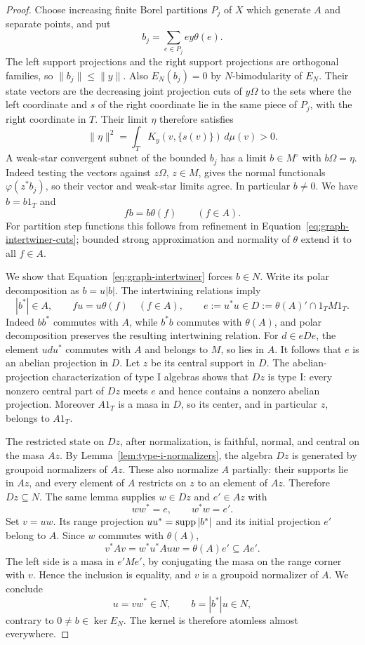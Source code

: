 \begin{proof}
Choose increasing finite Borel partitions $P_j$ of $X$ which generate
$A$ and separate points, and put
\begin{equation}\label{eq:graph-intertwiner-cuts}
 b_j=\sum_{e\in P_j} e y\theta(e).
\end{equation}
The left support projections and the right support projections are
orthogonal families, so $\|b_j\|\leq\|y\|$.
Also $E_N(b_j)=0$ by $N$-bimodularity of $E_N$.
Their state vectors are the decreasing joint projection cuts of
$y\Omega$ to the sets where the left coordinate and $s$ of the right
coordinate lie in the same piece of $P_j$, with the right coordinate
in $T$.  Their limit $\eta$ therefore satisfies
\[
 \|\eta\|^2
 =\int_T K_y(v,\{s(v)\})\,d\mu(v)>0.
\]
A weak-star convergent subnet of the bounded $b_j$ has a limit
$b\in M^\circ$ with $b\Omega=\eta$.  Indeed testing the vectors
against $z\Omega$, $z\in M$, gives the normal functionals
$\varphi(z^*b_j)$, so their vector and weak-star limits agree.
In particular $b\ne0$.  We have $b=b1_T$ and
\begin{equation}\label{eq:graph-intertwiner}
 fb=b\theta(f)\qquad(f\in A).
\end{equation}
For partition step functions this follows from refinement in
Equation~\eqref{eq:graph-intertwiner-cuts}; bounded strong approximation
and normality of $\theta$ extend it to all $f\in A$.

We show that Equation~\eqref{eq:graph-intertwiner} forces $b\in N$.
Write its polar decomposition as $b=u|b|$.
The intertwining relations imply
\[
 |b^*|\in A,\qquad fu=u\theta(f)\quad(f\in A),
 \qquad e:=u^*u\in D:=\theta(A)'\cap1_T M1_T.
\]
Indeed $bb^*$ commutes with $A$, while $b^*b$ commutes with
$\theta(A)$, and polar decomposition preserves the resulting
intertwining relation.  For $d\in eDe$, the element $udu^*$ commutes
with $A$ and belongs to $M$, so lies in $A$.  It follows that $e$ is an
abelian projection in $D$.
Let $z$ be its central support in $D$.
The abelian-projection characterization of type I algebras
\cite[Sections~6.4--6.6]{KR86} shows that $Dz$ is type I: every nonzero central part of
$Dz$ meets $e$ and hence contains a nonzero abelian projection.
Moreover $A1_T$ is a masa in $D$, so its center, and in particular
$z$, belongs to $A1_T$.

The restricted state on $Dz$, after normalization, is faithful,
normal, and central on the masa $Az$.  By
Lemma~\ref{lem:type-i-normalizers}, the algebra $Dz$ is generated by
groupoid normalizers of $Az$.  These also normalize $A$ partially:
their supports lie in $Az$, and every element of $A$ restricts on $z$
to an element of $Az$.  Therefore $Dz\subseteq N$.
The same lemma supplies $w\in Dz$ and $e'\in Az$ with
\[
 ww^*=e,\qquad w^*w=e'.
\]
Set $v=uw$.  Its range projection $uu^*=\operatorname{supp}|b^*|$ and its initial
projection $e'$ belong to $A$.  Since $w$ commutes with $\theta(A)$,
\[
 v^*Av=w^*u^*Auw=\theta(A)e'\subseteq Ae'.
\]
The left side is a masa in $e'Me'$, by conjugating the masa on the
range corner with $v$.  Hence the inclusion is equality, and $v$ is
a groupoid normalizer of $A$.  We conclude
\[
 u=vw^*\in N,\qquad b=|b^*|u\in N,
\]
contrary to $0\ne b\in\ker E_N$.  The kernel is therefore atomless
almost everywhere.


\end{proof}
